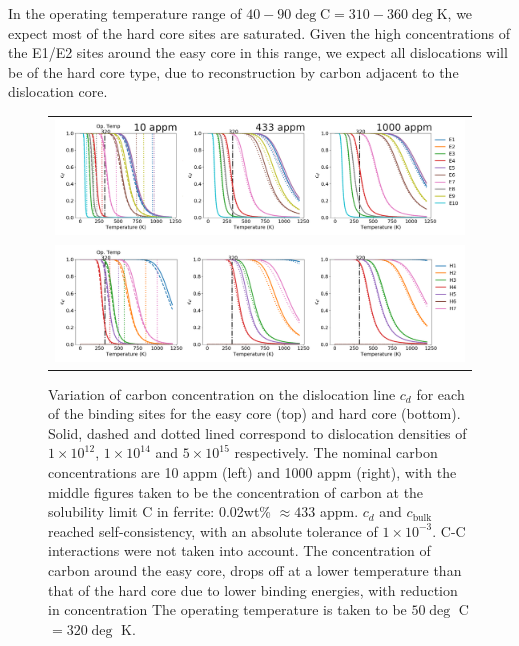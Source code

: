 \documentclass[a4paper,11pt]{article}
\begin{document}
In the operating temperature range of \(40-90\deg\text{C} = 310-360\deg\text{K}\), we expect most
of the hard core sites are saturated. Given the high concentrations of the E1/E2 sites around
the easy core in this range, we expect all dislocations will be of the hard core type, due to
reconstruction by carbon adjacent to the dislocation core. 



\begin{landscape}
   \begin{figure}	
       \begin{tabular}{c}
      	        \includegraphics[width=1.65\textwidth]{../Images/cd_easy_core_ferrite_sc_all_10_433_1000_appm.png}  \\
      	        \includegraphics[width=1.65\textwidth]{../Images/cd_hard_core_ferrite_sc_all_10_433_1000_appm.png}  \\

          	   \end{tabular}		
   \caption{ Variation of carbon concentration on the dislocation line $c_d$ for each of the binding sites for the easy core (top) and hard core (bottom). Solid, dashed and dotted lined correspond to dislocation densities of $1\times10^{12}$, $1\times10^{14}$ and $5\times10^{15}$ respectively. The nominal carbon concentrations are 10 appm (left) and 1000 appm (right), with the middle figures taken to be the concentration of carbon at the solubility limit C in ferrite: 0.02wt\% $\approx433$ appm. $c_d$ and $c_{\text{bulk}}$ reached self-consistency, with an absolute tolerance of $1\times10^{-3}$. C-C interactions were not taken into account. The concentration of carbon around the easy core, drops off at a lower temperature than that of the hard core due to lower binding energies, with reduction in concentration  The operating temperature is taken to be $50\deg$ C $= 320 \deg$ K. }
   \label{cdhardeasy}
      \end{figure}
      \end{landscape}
\end{document}
